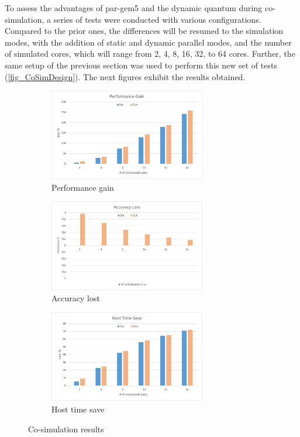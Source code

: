 To assess the advantages of par-gem5 and the dynamic quantum during co-simulation, a series of tests were conducted with various configurations. 
Compared to the prior ones, the differences will be resumed to the simulation modes, with the addition of static and dynamic parallel modes, 
and the number of simulated cores, which will range from 2, 4, 8, 16, 32, to 64 cores. Further, the same setup of the previous section was used  
to perform this new set of tests (\autoref{fig_CoSimDesign}). The next figures exhibit the results obtained. 


\begin{figure}[]
	\centering
	\begin{subfigure}{\textwidth}
		\centering
		\includegraphics[width=0.75\textwidth]{Images/Performance_CO_SIM.png}
		\caption{ Performance gain}
	\end{subfigure}
	\begin{subfigure}{\textwidth}
		\centering
		\includegraphics[width=0.75\textwidth]{Images/Accuracy_CO_SIM.png}
		\caption{ Accuracy lost}
	\end{subfigure}
	\begin{subfigure}{\textwidth}
		\centering
		\includegraphics[width=0.75\textwidth]{Images/Host_CO_SIM.png}
		\caption{ Host time save}
	\end{subfigure}
			
	\caption{Co-simulation results}
\end{figure}


